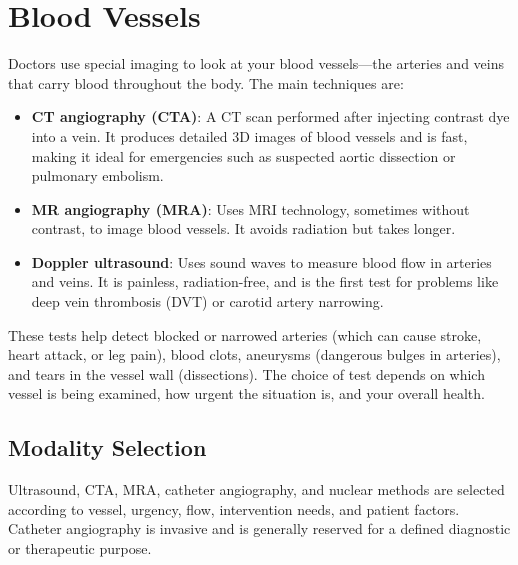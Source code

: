 \chapter{Blood Vessels}

\label{ch:ch43_blood_vessels}

Doctors use special imaging to look at your blood vessels---the arteries and veins that carry blood throughout the body. The main techniques are:

\begin{itemize}
  \item \textbf{CT angiography (CTA)}: A CT scan performed after injecting contrast dye into a vein. It produces detailed 3D images of blood vessels and is fast, making it ideal for emergencies such as suspected aortic dissection or pulmonary embolism.
  \item \textbf{MR angiography (MRA)}: Uses MRI technology, sometimes without contrast, to image blood vessels. It avoids radiation but takes longer.
  \item \textbf{Doppler ultrasound}: Uses sound waves to measure blood flow in arteries and veins. It is painless, radiation-free, and is the first test for problems like deep vein thrombosis (DVT) or carotid artery narrowing.
\end{itemize}

These tests help detect blocked or narrowed arteries (which can cause stroke, heart attack, or leg pain), blood clots, aneurysms (dangerous bulges in arteries), and tears in the vessel wall (dissections). The choice of test depends on which vessel is being examined, how urgent the situation is, and your overall health.


\section{Modality Selection}
Ultrasound, CTA, MRA, catheter angiography, and nuclear methods are selected according to vessel, urgency, flow, intervention needs, and patient factors. Catheter angiography is invasive and is generally reserved for a defined diagnostic or therapeutic purpose.


